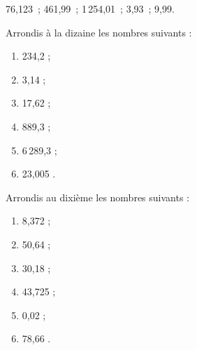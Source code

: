 \begin{exercice}
76,123 ; 461,99 ; 1\,254,01 ; 3,93 ; 9,99.
\end{exercice}


\begin{exercice}
Arrondis à la dizaine les nombres suivants :
\begin{enumerate}
 \item 234,2 \dotfill ; \hspace*{13em}
 
 \item 3,14 \dotfill ; \hspace*{13em}
 
 \item 17,62 \dotfill ; \hspace*{13em}
 
 \item 889,3 \dotfill ; \hspace*{13em}
 
 \item 6\,289,3 \dotfill ; \hspace*{13em}
 
 \item 23,005 \dotfill. \hspace*{13em}
 
 \end{enumerate}
\end{exercice}


\begin{exercice}
Arrondis au dixième les nombres suivants :
\begin{enumerate}
 \item 8,372 \dotfill ; \hspace*{13em}
 
 \item 50,64 \dotfill ; \hspace*{13em}
 
 \item 30,18 \dotfill ; \hspace*{13em}
 
 \item 43,725 \dotfill ; \hspace*{13em}
 
 \item 0,02 \dotfill ; \hspace*{13em}
 
 \item 78,66 \dotfill. \hspace*{13em}
 
 \end{enumerate}
\end{exercice}


